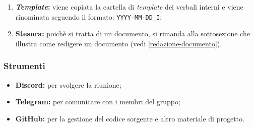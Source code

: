 \begin{itemize}
\begin{enumerate}
		      \item \textbf{\textit{Template}:} viene copiata la cartella di \textit{template} dei
		            verbali interni e viene rinominata
		            seguendo il formato: \texttt{YYYY-MM-DD\_I};

		      \item \textbf{Stesura:} poichè si tratta di un documento, si
		            rimanda alla sottosezione che illustra come redigere un
		            documento (vedi \cref{redazione-documento}).
	      \end{enumerate}
\end{itemize}

\subsubsection{Strumenti}
\begin{itemize}
	\item \textbf{Discord\g:} per svolgere la riunione;
	\item \textbf{Telegram\g:} per comunicare con i membri del gruppo;
	\item \textbf{GitHub\g:} per la gestione del codice sorgente e altro
	      materiale di progetto.
\end{itemize}
